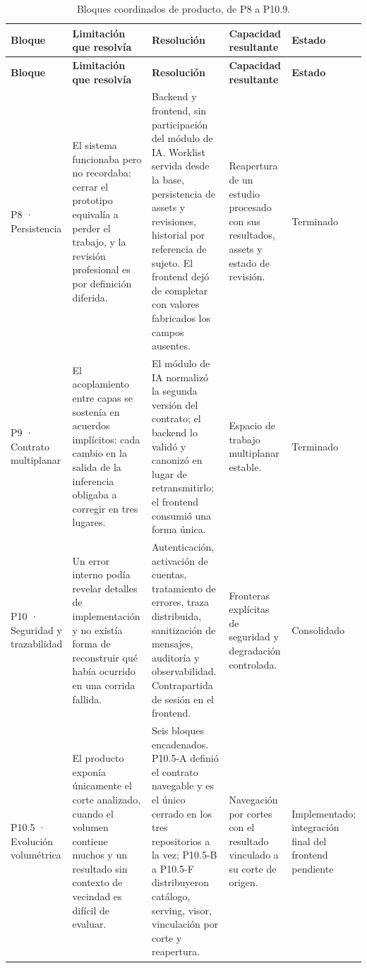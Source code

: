 \begin{longtable}{|>{\raggedright\arraybackslash}p{}|>{\raggedright\arraybackslash}p{}|>{\raggedright\arraybackslash}p{}|>{\raggedright\arraybackslash}p{}|>{\raggedright\arraybackslash}p{}|}
\caption{Bloques coordinados de producto, de P8 a P10.9.}
\label{tab:anexo-f-bloques-coordinados}\\
\hline
\textbf{Bloque} & \textbf{Limitación que resolvía} & \textbf{Resolución} & \textbf{Capacidad resultante} & \textbf{Estado} \\
\hline
\endfirsthead
\hline
\textbf{Bloque} & \textbf{Limitación que resolvía} & \textbf{Resolución} & \textbf{Capacidad resultante} & \textbf{Estado} \\
\hline
\endhead
P8 · Persistencia & El sistema funcionaba pero no recordaba: cerrar el prototipo equivalía a perder el trabajo, y la revisión profesional es por definición diferida. & Backend y frontend, sin participación del módulo de IA. Worklist servida desde la base, persistencia de assets y revisiones, historial por referencia de sujeto. El frontend dejó de completar con valores fabricados los campos ausentes. & Reapertura de un estudio procesado con sus resultados, assets y estado de revisión. & Terminado \\
\hline
P9 · Contrato multiplanar & El acoplamiento entre capas se sostenía en acuerdos implícitos: cada cambio en la salida de la inferencia obligaba a corregir en tres lugares. & El módulo de IA normalizó la segunda versión del contrato; el backend lo validó y canonizó en lugar de retransmitirlo; el frontend consumió una forma única. & Espacio de trabajo multiplanar estable. & Terminado \\
\hline
P10 · Seguridad y trazabilidad & Un error interno podía revelar detalles de implementación y no existía forma de reconstruir qué había ocurrido en una corrida fallida. & Autenticación, activación de cuentas, tratamiento de errores, traza distribuida, sanitización de mensajes, auditoría y observabilidad. Contrapartida de sesión en el frontend. & Fronteras explícitas de seguridad y degradación controlada. & Consolidado \\
\hline
P10.5 · Evolución volumétrica & El producto exponía únicamente el corte analizado, cuando el volumen contiene muchos y un resultado sin contexto de vecindad es difícil de evaluar. & Seis bloques encadenados. P10.5-A definió el contrato navegable y es el único cerrado en los tres repositorios a la vez; P10.5-B a P10.5-F distribuyeron catálogo, serving, visor, vinculación por corte y reapertura. & Navegación por cortes con el resultado vinculado a su corte de origen. & Implementado; integración final del frontend pendiente \\

\end{longtable}
